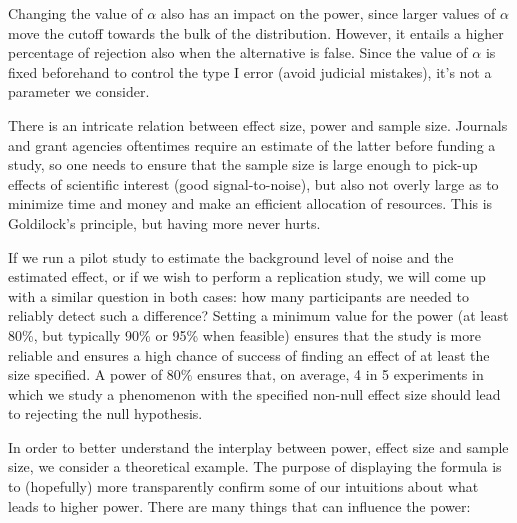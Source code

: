 \documentclass[
  11pt,
  letterpaper,
]{scrbook}
\theoremstyle{definition}
\theoremstyle{definition}
\theoremstyle{remark}
\begin{document}
Changing the value of \(\alpha\) also has an impact on the power, since
larger values of \(\alpha\) move the cutoff towards the bulk of the
distribution. However, it entails a higher percentage of rejection also
when the alternative is false. Since the value of \(\alpha\) is fixed
beforehand to control the type I error (avoid judicial mistakes), it's
not a parameter we consider.

There is an intricate relation between effect size, power and sample
size. Journals and grant agencies oftentimes require an estimate of the
latter before funding a study, so one needs to ensure that the sample
size is large enough to pick-up effects of scientific interest (good
signal-to-noise), but also not overly large as to minimize time and
money and make an efficient allocation of resources. This is Goldilock's
principle, but having more never hurts.

If we run a pilot study to estimate the background level of noise and
the estimated effect, or if we wish to perform a replication study, we
will come up with a similar question in both cases: how many
participants are needed to reliably detect such a difference? Setting a
minimum value for the power (at least 80\%, but typically 90\% or 95\%
when feasible) ensures that the study is more reliable and ensures a
high chance of success of finding an effect of at least the size
specified. A power of 80\% ensures that, on average, 4 in 5 experiments
in which we study a phenomenon with the specified non-null effect size
should lead to rejecting the null hypothesis.

In order to better understand the interplay between power, effect size
and sample size, we consider a theoretical example. The purpose of
displaying the formula is to (hopefully) more transparently confirm some
of our intuitions about what leads to higher power. There are many
things that can influence the power:
\end{document}
